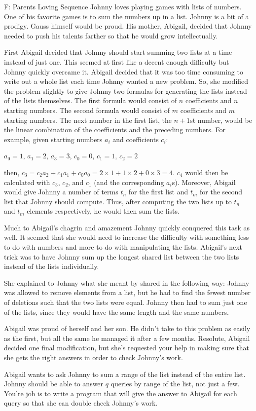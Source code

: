 \begin{problem}{F: Parents Loving Sequence}
Johnny loves playing games with lists of numbers.
One of his favorite games is to sum the numbers up in a list.
Johnny is a bit of a prodigy.
Gauss himself would be proud.
His mother, Abigail, decided that Johnny needed to push his talents farther so that he would grow intellectually.

First Abigail decided that Johnny should start summing two lists at a time instead of just one.
This seemed at first like a decent enough difficulty but Johnny quickly overcame it.
Abigail decided that it was too time consuming to write out a whole list each time Johnny wanted a new problem.
So, she modified the problem slightly to give Johnny two formulas for generating the lists instead of the lists themselves.
The first formula would consist of $n$ coefficients and $n$ starting numbers.
The second formula would consist of $m$ coefficients and $m$ starting numbers.
The next number in the first list, the $n+1$st number, would be the linear combination of the coefficients and the preceding numbers.
For example, given starting numbers $a_i$ and coefficients $c_i$:

$a_0 = 1$, $a_1 = 2$, $a_3 = 3$, $c_0 = 0$, $c_1 = 1$, $c_2 = 2$

then, $c_3 = c_2a_2 + c_1a_1 + c_0a_0 = 2\times 1 + 1\times 2 + 0\times 3 = 4$.
$c_4$ would then be calculated with $c_3$, $c_2$, and $c_1$ (and the corresponding $a_i$s).
Moreover, Abigail would give Johnny a number of terms $t_n$ for the first list and $t_m$ for the second list that Johnny should compute.
Thus, after computing the two lists up to $t_n$ and $t_m$ elements respectively, he would then sum the lists.

Much to Abigail's chagrin and amazement Johnny quickly conquered this task as well.
It seemed that she would need to increase the difficulty with something less to do with numbers and more to do with manipulating the lists.
Abigail's next trick was to have Johnny sum up the longest shared list between the two lists instead of the lists individually.

She explained to Johnny what she meant by shared in the following way:
Johnny was allowed to remove elements from a list, but he had to find the fewest number of deletions such that the two lists were equal.
Johnny then had to sum just one of the lists, since they would have the same length and the same numbers.

Abigail was proud of herself and her son.
He didn't take to this problem as easily as the first, but all the same he managed it after a few months.
Resolute, Abigail decided one final modification, but she's requested your help in making sure that she gets the right answers in order to check Johnny's work.

Abigail wants to ask Johnny to sum a range of the list instead of the entire list.
Johnny should be able to answer $q$ queries by range of the list, not just a few.
You're job is to write a program that will give the answer to Abigail for each query so that she can double check Johnny's work.
\end{problem}
